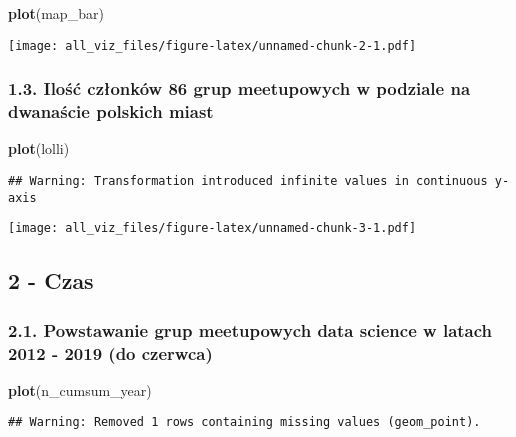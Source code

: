 \documentclass[]{article}
\newenvironment{Shaded}{\begin{snugshade}}{\end{snugshade}}
\newcommand{\KeywordTok}[1]{\textcolor[rgb]{0.13,0.29,0.53}{\textbf{#1}}}
\newcommand{\NormalTok}[1]{#1}
\begin{document}
\begin{Shaded}
\begin{Highlighting}[]
\KeywordTok{plot}\NormalTok{(map_bar)}
\end{Highlighting}
\end{Shaded}

\texttt{[image: all\_viz\_files/figure-latex/unnamed-chunk-2-1.pdf]}

\hypertarget{ilosc-czonkow-86-grup-meetupowych-w-podziale-na-dwanascie-polskich-miast}{%
\subsubsection{1.3. Ilość członków 86 grup meetupowych w podziale na
dwanaście polskich
miast}\label{ilosc-czonkow-86-grup-meetupowych-w-podziale-na-dwanascie-polskich-miast}}

\begin{Shaded}
\begin{Highlighting}[]
\KeywordTok{plot}\NormalTok{(lolli)}
\end{Highlighting}
\end{Shaded}

\begin{verbatim}
## Warning: Transformation introduced infinite values in continuous y-axis
\end{verbatim}

\texttt{[image: all\_viz\_files/figure-latex/unnamed-chunk-3-1.pdf]}

\hypertarget{czas}{%
\subsection{2 - Czas}\label{czas}}

\hypertarget{powstawanie-grup-meetupowych-data-science-w-latach-2012---2019-do-czerwca}{%
\subsubsection{2.1. Powstawanie grup meetupowych data science w latach
2012 - 2019 (do
czerwca)}\label{powstawanie-grup-meetupowych-data-science-w-latach-2012---2019-do-czerwca}}

\begin{Shaded}
\begin{Highlighting}[]
\KeywordTok{plot}\NormalTok{(n_cumsum_year)}
\end{Highlighting}
\end{Shaded}

\begin{verbatim}
## Warning: Removed 1 rows containing missing values (geom_point).
\end{verbatim}
\end{document}
